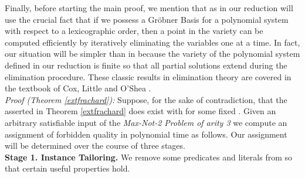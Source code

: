 \documentclass{article}
\begin{document}
Finally, before starting the main proof, we mention that as in \citep{RS} our reduction will use the crucial fact that if we possess a Gr\"{o}bner Basis for a polynomial system with respect to a lexicographic order, then a point in the variety can be computed efficiently by iteratively eliminating the variables one at a time. In fact, our situation will be simpler than in \citep{RS} because the variety of the polynomial system defined in our reduction is finite so that all partial solutions extend during the elimination procedure. These classic results in elimination theory are covered in the textbook of Cox, Little and O'Shea \cite{Cox}.\\

\noindent \textit{Proof (Theorem \ref{extfrachard}):} Suppose, for the sake of contradiction, that the  asserted in Theorem \ref{extfrachard} does exist with  for some fixed . Given an arbitrary satisfiable input  of the \textit{Max-Not-2 Problem of arity 3} we compute an assignment of forbidden quality in polynomial time as follows. Our assignment will be determined over the course of three stages. \\

\noindent \textbf{Stage 1. Instance Tailoring.} We remove some predicates and literals from  so that certain useful properties hold. 
\end{document}
